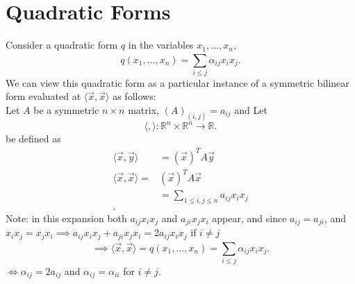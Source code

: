 \documentclass{report}
\begin{document}
  \section{Quadratic Forms}
 Consider a quadratic form $ q$ in the variables $ x_1, \ldots , x_n$,
 \[
 q \left( x_1,  \ldots , x_n \right) = \sum\limits_{i \le j}^{}  \alpha_{ij} x_i x_j 
 
 .\] 
 We can view this quadratic form as a particular instance of a symmetric bilinear form evaluated at  $ \langle  \vec{ x} , \vec{ x}   \rangle $ as follows:\\

 Let $ A$ be a symmetric $n \times n$  matrix, $ \left( A \right) _{ (i,j) } =a_{ij}$ and Let 
 \[
 \langle ,  \rangle : \mathbb{R} ^{n} \times  \mathbb{R} ^{n} \to \mathbb{R} 
 .\] 
 be defined as
 \begin{align*}
  \langle \vec{ x} , \vec{ y}   \rangle &= \left( \vec{ x}  \right) ^{T} A \vec{ y} \\
  \langle \vec{ x} ,\vec{ x}   \rangle =& \left( \vec{ x}  \right) ^{T} A \vec{ x} \\
  &= \sum\limits_{1 \leq i,j \leq n}^{} a_{ij} x_i x_j\\
 .\end{align*}
 Note: in this expansion both $ a_{ij} x_i x_j$ and $ a_{ji} x_j x_i$ appear, and since $ a_{ij} = a_{ji}$, and $ x_i x_j= x_j x_i \implies a_{ij} x_i x_j + a_{ji}x_j x_i = 2a_{ij}x_i x_j $ if $ i \neq j$
 \[
 \implies \langle \vec{ x} ,\vec{ x}   \rangle = q \left( x_1, \ldots , x_n \right) = \sum\limits_{i \le j}^{}  \alpha_{ij} x_i x_j 
 .\] 
 $ \iff \alpha_{ij}= 2 a_{ij}$ and $ \alpha _{ ij} = \alpha _{ i i}$ for $ i \neq j$.\\
   
\end{document}
